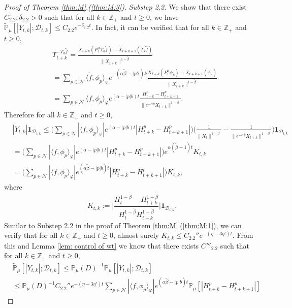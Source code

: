 \documentclass[EJP]{ejpecp} %
\begin{document}
\begin{proof}[Proof of Theorem \ref{thm:M}.(\ref{thm:M:3})]
  	\emph{Substep 2.2.} We show that there exist $C_{2.2}, \delta_{2.2}>0$ such that for all $k \in \mathbb Z_+$ and $t\geq 0$, we have $\widetilde {\mathbb {P}}_\mu[|Y_{t,k}|; \mathcal D_{t,k}]\leq C_{2.2}e^{- \delta_{2,2} t}$.
  	In fact, it can be verified that for all $k \in \mathbb Z_+$ and $t\geq 0$,
\begin{align}
    & \Upsilon_{t+k}^{-T_k\tilde f}
   	= \frac{X_{t+k}(P^\alpha_1T_k\tilde f) - X_{t+k+1}(T_k \tilde f)}{\|X_{t+k}\|^{1 - \tilde \beta}}
    \\& = \sum_{p\in \mathcal N}
    \langle\tilde f,\phi_p\rangle_\varphi e^{-(\alpha \tilde \beta - |pb|)k}\frac{ X_{t+k}(P_1^\alpha \phi_p) - X_{t+k+1}(\phi_p)}{\|X_{t+k}\|^{1 - \tilde \beta}}
    \\& = \sum_{p\in \mathcal N}
    \langle f,\phi_p\rangle_\varphi  e^{(\alpha  -|p|b)t}\frac{H_{t+k}^p-H_{t+k+1}^p }{\|e^{-\alpha k}X_{t+k}\|^{1 - \tilde \beta}}.
\end{align}
	Therefore for all $k\in \mathbb Z_+$ and $t\geq 0$,
\begin{align}
 	&|Y_{t,k}| \mathbf 1_{\mathcal D_{t,k}}
   	\leq \Big( \sum_{p\in \mathcal N}|\langle f,\phi_p\rangle_\varphi|  e^{(\alpha  -|p|b)t} | H_{t+k}^p-H_{t+k+1}^p |\Big) \Big( \frac{1}{\|X_t\|^{1 - \tilde \beta}} - \frac{1}{\|e^{-\alpha k}X_{t+k}\|^{1 - \tilde \beta}} \Big)
   	\mathbf 1_{\mathcal D_{t,k}}
    \\ &= \Big( \sum_{p\in \mathcal N}|\langle f,\phi_p\rangle_\varphi|  e^{(\alpha  -|p|b)t} | H_{t+k}^p-H_{t+k+1}^p |\Big)e^{\alpha (\tilde \beta - 1)t} K_{t,k}
    \\ &= \Big( \sum_{p\in \mathcal N}|\langle f,\phi_p\rangle_\varphi|  e^{(\alpha \tilde \beta  -|p|b)t} | H_{t+k}^p-H_{t+k+1}^p |\Big) K_{t,k},
\end{align}
	where
\[
    K_{t,k}
    := \Big| \frac {H_t^{1- \tilde \beta} - H_{t+k}^{1 - \tilde \beta}} {H_t^{1 - \tilde \beta} H_{t+k}^{ 1- \tilde \beta }} \Big| \mathbf{1}_{\mathcal{D}_{t,k}}.
\]
	Similar to Substep 2.2 in the proof of Theorem \ref{thm:M}.(\ref{thm:M:1}), we can verify that for all $k\in \mathbb Z_+$ and $t\geq 0$, almost surely $K_{t,k} \leq C_{2.2}'' e^{- (\eta - 3\eta')t}$.
	From this and Lemma \ref{lem: control of wt} we know that there exists $C'''_{2.2}$ such that for all $k\in \mathbb Z_+$ and $t\geq 0$,
\begin{align}
   	& \widetilde{\mathbb P}_\mu[|Y_{t,k}|; \mathcal D_{t,k}]
   	\leq \mathbb P_\mu(D)^{-1}\mathbb P_\mu[ |Y_{t,k}| ;\mathcal D_{t,k} ]
  	\\ & \leq \mathbb P_{\mu}(D)^{-1} C_{2.2}'' e^{- (\eta - 3\eta') t}\sum_{p\in \mathcal {N}} |\langle f,\phi_p\rangle_\varphi|  e^{(\alpha \tilde \beta  -|p|b)t} \mathbb P_\mu[| H_{t+k}^p-H_{t+k+1}^p |]

\end{align}
\end{proof}
\end{document}
